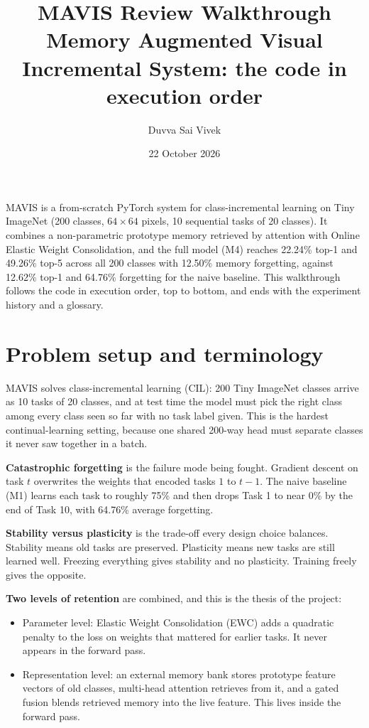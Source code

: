 \documentclass[11pt,a4paper]{article}
\title{\sffamily\bfseries MAVIS Review Walkthrough\\[4pt]
\large Memory Augmented Visual Incremental System: the code in execution order}
\author{Duvva Sai Vivek}
\date{22 October 2026}
\begin{document}
\maketitle

MAVIS is a from-scratch PyTorch system for class-incremental learning on Tiny ImageNet (200 classes, $64 \times 64$ pixels, 10 sequential tasks of 20 classes). It combines a non-parametric prototype memory retrieved by attention with Online Elastic Weight Consolidation, and the full model (M4) reaches 22.24\% top-1 and 49.26\% top-5 across all 200 classes with 12.50\% memory forgetting, against 12.62\% top-1 and 64.76\% forgetting for the naive baseline. This walkthrough follows the code in execution order, top to bottom, and ends with the experiment history and a glossary.

\tableofcontents
\clearpage

\section{Problem setup and terminology}

MAVIS solves class-incremental learning (CIL): 200 Tiny ImageNet classes arrive as 10 tasks of 20 classes, and at test time the model must pick the right class among every class seen so far with no task label given. This is the hardest continual-learning setting, because one shared 200-way head must separate classes it never saw together in a batch.

\textbf{Catastrophic forgetting} is the failure mode being fought. Gradient descent on task $t$ overwrites the weights that encoded tasks $1$ to $t-1$. The naive baseline (M1) learns each task to roughly 75\% and then drops Task 1 to near 0\% by the end of Task 10, with 64.76\% average forgetting.

\textbf{Stability versus plasticity} is the trade-off every design choice balances. Stability means old tasks are preserved. Plasticity means new tasks are still learned well. Freezing everything gives stability and no plasticity. Training freely gives the opposite.

\textbf{Two levels of retention} are combined, and this is the thesis of the project:
\begin{itemize}
  \item Parameter level: Elastic Weight Consolidation (EWC) adds a quadratic penalty to the loss on weights that mattered for earlier tasks. It never appears in the forward pass.
  \item Representation level: an external memory bank stores prototype feature vectors of old classes, multi-head attention retrieves from it, and a gated fusion blends retrieved memory into the live feature. This lives inside the forward pass.
\end{itemize}
\end{document}
